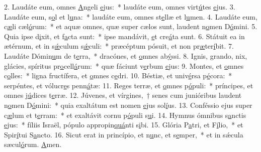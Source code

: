 2. Laudáte eum, omnes \uline{A}ngeli \uline{e}jus:~* laudáte eum, omnes virt\uline{ú}tes \uline{e}jus.
3. Laudáte eum, s\uline{o}l et l\uline{u}na:~* laudáte eum, omnes st\uline{e}llæ et l\uline{u}men.
4. Laudáte eum, c\uline{æ}li cæl\uline{ó}rum:~* et aquæ omnes, quæ super cælos sunt, laudent n\uline{o}men D\uline{ó}mini.
5. Quia ipse d\uline{i}xit, et f\uline{a}cta sunt:~* ipse mandávit, \uline{e}t cre\uline{á}ta sunt.
6. Státuit ea in ætérnum, et in s\uline{ǽ}culum s\uline{ǽ}culi:~* præcéptum pósuit, et non pr\uline{æ}ter\uline{í}bit.
7. Laudáte Dómin\uline{u}m de t\uline{e}rra,~* dracónes, et \uline{o}mnes ab\uline{ý}ssi.
8. Ignis, grando, nix, glácies, spíritus pr\uline{o}cell\uline{á}rum:~* quæ fáciunt v\uline{e}rbum \uline{e}jus:
9. Montes, et \uline{o}mnes c\uline{o}lles:~* ligna fructífera, et \uline{o}mnes c\uline{e}dri.
10. Béstiæ, et univ\uline{é}rsa p\uline{é}cora:~* serpéntes, et vólucr\uline{e}s penn\uline{á}tæ:
11. Reges terræ, et \uline{o}mnes p\uline{ó}puli:~* príncipes, et omnes j\uline{ú}dices t\uline{e}rræ.
12. Júvenes, et vírgines,~† senes cum junióribus laudent n\uline{o}men D\uline{ó}mini:~* quia exaltátum est nomen \uline{e}jus sol\uline{í}us.
13. Conféssio ejus super c\uline{æ}lum et t\uline{e}rram:~* et exaltávit cornu p\uline{ó}puli s\uline{u}i.
14. Hymnus ómnibus s\uline{a}nctis \uline{e}jus:~* fíliis Israël, pópulo appropin\uline{quá}nti s\uline{i}bi.
15. Glória P\uline{a}tri, et F\uline{í}lio,~* et Spir\uline{í}tui S\uline{a}ncto.
16. Sicut erat in princípio, et n\uline{u}nc, et s\uline{e}mper,~* et in sǽcula sæcul\uline{ó}rum. \uline{A}men.
